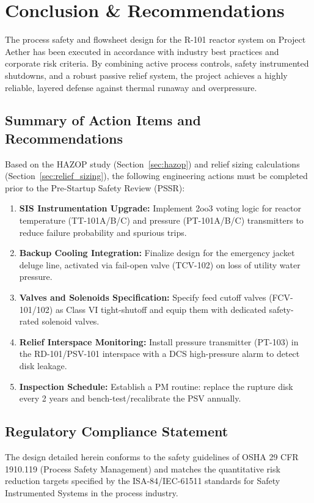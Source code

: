 \section{Conclusion \& Recommendations}
\label{sec:conclusion}

The process safety and flowsheet design for the R-101 reactor system on Project Aether has been executed in accordance with industry best practices and corporate risk criteria. By combining active process controls, safety instrumented shutdowns, and a robust passive relief system, the project achieves a highly reliable, layered defense against thermal runaway and overpressure.

\subsection{Summary of Action Items and Recommendations}
Based on the HAZOP study (Section~\ref{sec:hazop}) and relief sizing calculations (Section~\ref{sec:relief_sizing}), the following engineering actions must be completed prior to the Pre-Startup Safety Review (PSSR):
\begin{enumerate}
    \item \textbf{SIS Instrumentation Upgrade:} Implement 2oo3 voting logic for reactor temperature (TT-101A/B/C) and pressure (PT-101A/B/C) transmitters to reduce failure probability and spurious trips.
    \item \textbf{Backup Cooling Integration:} Finalize design for the emergency jacket deluge line, activated via fail-open valve (TCV-102) on loss of utility water pressure.
    \item \textbf{Valves and Solenoids Specification:} Specify feed cutoff valves (FCV-101/102) as Class VI tight-shutoff and equip them with dedicated safety-rated solenoid valves.
    \item \textbf{Relief Interspace Monitoring:} Install pressure transmitter (PT-103) in the RD-101/PSV-101 interspace with a DCS high-pressure alarm to detect disk leakage.
    \item \textbf{Inspection Schedule:} Establish a PM routine: replace the rupture disk every 2 years and bench-test/recalibrate the PSV annually.
\end{enumerate}

\subsection{Regulatory Compliance Statement}
The design detailed herein conforms to the safety guidelines of OSHA 29 CFR 1910.119 (Process Safety Management) and matches the quantitative risk reduction targets specified by the ISA-84/IEC-61511 standards for Safety Instrumented Systems in the process industry.
